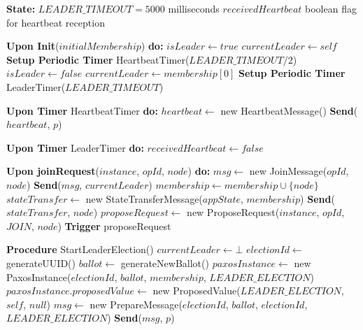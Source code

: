 \documentclass[10pt,a4paper,twocolumn]{article}
\begin{document}
\begin{algorithm}
\caption{Multi-Paxos Leader Election and Membership Management}
\begin{algorithmic}
\State \textbf{State:}
\State \hspace{1em} $LEADER\_TIMEOUT = 5000$ {milliseconds}
\State \hspace{1em} $receivedHeartbeat$ {boolean flag for heartbeat reception}
\State

\State \textbf{Upon Init}($initialMembership$) \textbf{do:}
\State $isLeader \leftarrow true$
\State $currentLeader \leftarrow self$
\State \textbf{Setup Periodic Timer} HeartbeatTimer($LEADER\_TIMEOUT/2$)
\Else
\State $isLeader \leftarrow false$
\State $currentLeader \leftarrow membership[0]$
\State \textbf{Setup Periodic Timer} LeaderTimer($LEADER\_TIMEOUT$)
\EndIf
\State

\State \textbf{Upon Timer} HeartbeatTimer \textbf{do:}
\State $heartbeat \leftarrow$ new HeartbeatMessage()
\State \textbf{Send}($heartbeat$, $p$)
\EndFor
\EndIf
\State

\State \textbf{Upon Timer} LeaderTimer \textbf{do:}
\State {}
\EndIf
\State $receivedHeartbeat \leftarrow false$
\State

\State \textbf{Upon joinRequest}($instance$, $opId$, $node$) \textbf{do:}
\State $msg \leftarrow$ new JoinMessage($opId$, $node$)
\State \textbf{Send}($msg$, $currentLeader$)
\State \Return
\EndIf
{}
\State $membership \leftarrow membership \cup \{node\}$
\State $stateTransfer \leftarrow$ new StateTransferMessage($appState$, $membership$)
\State \textbf{Send}($stateTransfer$, $node$)
\State \Return
\EndIf
\State $proposeRequest \leftarrow$ new ProposeRequest($instance$, $opId$, $JOIN$, $node$)
\State \textbf{Trigger} proposeRequest
\State

\State \textbf{Procedure} StartLeaderElection()
\State $currentLeader \leftarrow \bot$
\State $electionId \leftarrow$ generateUUID()
\State $ballot \leftarrow$ generateNewBallot()
\State $paxosInstance \leftarrow$ new PaxosInstance($electionId$, $ballot$, $membership$, $LEADER\_ELECTION$)
\State $paxosInstance.proposedValue \leftarrow$ new ProposedValue($LEADER\_ELECTION$, $self$, $null$)
\State $msg \leftarrow$ new PrepareMessage($electionId$, $ballot$, $electionId$, $LEADER\_ELECTION$)
\State \textbf{Send}($msg$, $p$)
\EndFor
\end{algorithmic}
\end{algorithm}
\end{document}
